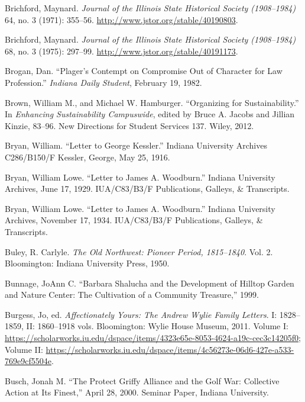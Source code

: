 \documentclass[
  american,
  letterpaper,
]{scrreprt}
\newlength{\cslhangindent}
\newenvironment{CSLReferences}[2] %
 {\begin{list}{}{%
  \setlength{\itemindent}{0pt}
  \setlength{\leftmargin}{0pt}
  \setlength{\parsep}{0pt}
  \ifodd #1
   \setlength{\leftmargin}{\cslhangindent}
   \setlength{\itemindent}{-1\cslhangindent}
  \fi
  \setlength{\itemsep}{#2\baselineskip}}}
 {\end{list}}
\begin{document}
\begin{CSLReferences}{1}{0}
Brichford, Maynard. \emph{Journal of the Illinois State Historical
Society (1908--1984)} 64, no. 3 (1971): 355--56.
\url{http://www.jstor.org/stable/40190803}.

Brichford, Maynard. \emph{Journal of the Illinois State Historical
Society (1908--1984)} 68, no. 3 (1975): 297--99.
\url{http://www.jstor.org/stable/40191173}.

Brogan, Dan. {``Plager's Contempt on Compromise Out of Character for Law
Profession.''} \emph{Indiana Daily Student}, February 19, 1982.

Brown, William M., and Michael W. Hamburger. {``Organizing for
Sustainability.''} In \emph{Enhancing Sustainability Campuswide}, edited
by Bruce A. Jacobs and Jillian Kinzie, 83--96. New Directions for
Student Services 137. Wiley, 2012.

Bryan, William. {``Letter to George Kessler.''} Indiana University
Archives C286/B150/F Kessler, George, May 25, 1916.

Bryan, William Lowe. {``Letter to James {A.} Woodburn.''} Indiana
University Archives, June 17, 1929. IUA/C83/B3/F Publications, Galleys,
\& Transcripts.

Bryan, William Lowe. {``Letter to James {A.} Woodburn.''} Indiana
University Archives, November 17, 1934. IUA/C83/B3/F Publications,
Galleys, \& Transcripts.

Buley, R. Carlyle. \emph{The Old Northwest: Pioneer Period, 1815--1840}.
Vol. 2. Bloomington: Indiana University Press, 1950.

Bunnage, JoAnn C. {``Barbara Shalucha and the Development of Hilltop
Garden and Nature Center: The Cultivation of a Community Treasure,''}
1999.

Burgess, Jo, ed. \emph{Affectionately Yours: The Andrew Wylie Family
Letters}. I: 1828--1859, II: 1860--1918 vols. Bloomington: Wylie House
Museum, 2011. Volume I:
\url{https://scholarworks.iu.edu/dspace/items/4323e65e-8053-4624-a19c-cec3c14205f0};
Volume II:
\url{https://scholarworks.iu.edu/dspace/items/4c56273e-06d6-427e-a533-769e9cf5504e}.

Busch, Jonah M. {``The Protect Griffy Alliance and the Golf War:
Collective Action at Its Finest,''} April 28, 2000. Seminar Paper,
Indiana University.


\end{CSLReferences}
\end{document}
